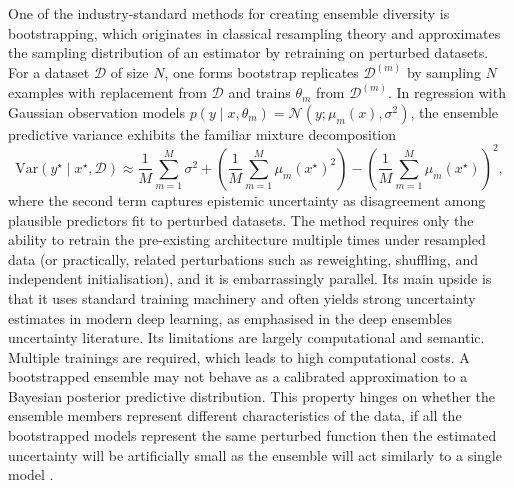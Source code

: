 One of the industry-standard methods for creating ensemble diversity is bootstrapping, which originates in classical resampling theory and approximates the sampling distribution of an estimator by retraining on perturbed datasets. For a dataset $\mathcal{D}$ of size $N$, one forms bootstrap replicates $\mathcal{D}^{(m)}$ by sampling $N$ examples with replacement from $\mathcal{D}$ and trains $\theta_m$ from $\mathcal{D}^{(m)}$. In regression with Gaussian observation models $p(y\mid x,\theta_m)=\mathcal{N}(y;\mu_m(x),\sigma^2)$, the ensemble predictive variance exhibits the familiar mixture decomposition
\begin{equation}
\mathrm{Var}(y^\star\mid x^\star,\mathcal{D})
\approx
\frac{1}{M}\sum_{m=1}^M \sigma^2
+
\left(\frac{1}{M}\sum_{m=1}^M \mu_m(x^\star)^2\right) -
\left(\frac{1}{M}\sum_{m=1}^M \mu_m(x^\star)\right)^2,
\end{equation}
where the second term captures epistemic uncertainty as disagreement among plausible predictors fit to perturbed datasets. The method requires only the ability to retrain the pre-existing architecture multiple times under resampled data (or practically, related perturbations such as reweighting, shuffling, and independent initialisation), and it is embarrassingly parallel. Its main upside is that it uses standard training machinery and often yields strong uncertainty estimates in modern deep learning, as emphasised in the deep ensembles uncertainty literature. Its limitations are largely computational and semantic. Multiple trainings are required, which leads to high computational costs. A bootstrapped ensemble may not behave as a calibrated approximation to a Bayesian posterior predictive distribution. This property hinges on whether the ensemble members represent different characteristics of the data, if all the bootstrapped models represent the same perturbed function then the estimated uncertainty will be artificially small as the ensemble will act similarly to a single model \cite{Lakshminarayanan2017,Wild2023}.

